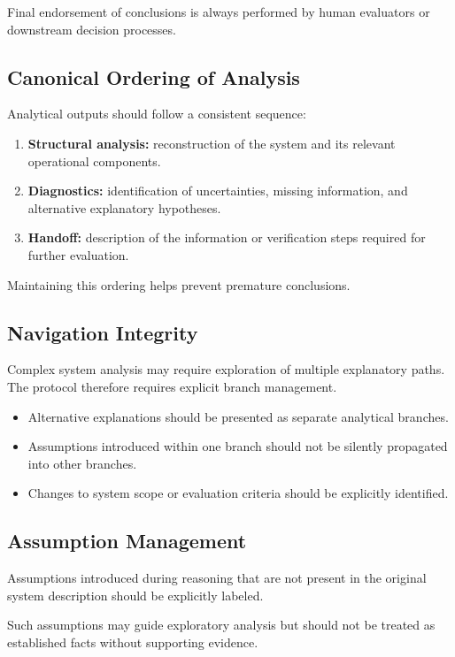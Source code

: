 Final endorsement of conclusions is always performed by human evaluators
or downstream decision processes.

\subsection{Canonical Ordering of Analysis}

Analytical outputs should follow a consistent sequence:

\begin{enumerate}
\item \textbf{Structural analysis:} reconstruction of the system and its
relevant operational components.
\item \textbf{Diagnostics:} identification of uncertainties, missing
information, and alternative explanatory hypotheses.
\item \textbf{Handoff:} description of the information or verification
steps required for further evaluation.
\end{enumerate}

Maintaining this ordering helps prevent premature conclusions.

\subsection{Navigation Integrity}

Complex system analysis may require exploration of multiple explanatory
paths. The protocol therefore requires explicit branch management.

\begin{itemize}
\item Alternative explanations should be presented as separate analytical
branches.
\item Assumptions introduced within one branch should not be silently
propagated into other branches.
\item Changes to system scope or evaluation criteria should be explicitly
identified.
\end{itemize}

\subsection{Assumption Management}

Assumptions introduced during reasoning that are not present in the
original system description should be explicitly labeled.

Such assumptions may guide exploratory analysis but should not be treated
as established facts without supporting evidence.

